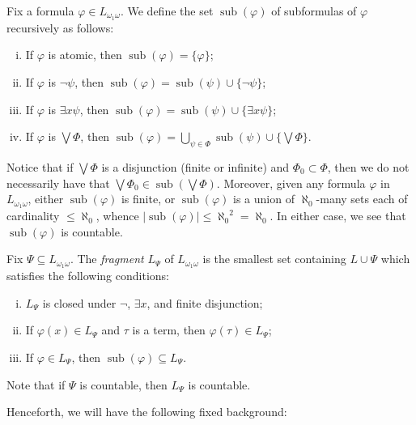 \documentclass{scrartcl}
\DeclareMathOperator{\sub}{sub}
\renewcommand{\phi}{\varphi}
\begin{document}
\begin{definition}
Fix a formula $\phi\in L_{\omega_1\omega}$. We define the set $\sub(\phi)$ of subformulas of $\phi$ recursively as follows:
\begin{enumerate}[i)]

\item If $\phi$ is atomic, then $\sub(\phi) = \{\phi\}$;

\item If $\phi$ is $\neg\psi$, then $\sub(\phi) = \sub(\psi)\cup \{\neg\psi\}$;

\item If $\phi$ is $\exists x\psi$, then $\sub(\phi) = \sub(\psi)\cup \{\exists x\psi\}$;

\item If $\phi$ is $\bigvee \Phi$, then $\sub(\phi) = \bigcup_{\psi\in\Phi} \sub(\psi)\cup \{\bigvee\Phi\}$.
\end{enumerate}
\end{definition}


Notice that if $\bigvee \Phi$ is a disjunction (finite or infinite) and $\Phi_0\subset \Phi$, then we do not necessarily have that $\bigvee \Phi_0 \in \sub (\bigvee \Phi)$. Moreover, given any formula $\phi$ in $L_{\omega_1\omega}$, either $\sub(\phi)$ is finite, or $\sub(\phi)$ is a union of $\aleph_{0}$-many sets each of cardinality $\le \aleph_{0}$, whence $|\sub(\phi)|\le {\aleph_{0}}^2 = \aleph_{0}$. In either case, we see that $\sub(\phi)$ is countable.


\begin{definition}
Fix $\Psi \subseteq L_{\omega_1\omega}$. The \emph{fragment} $L_\Psi$ of $L_{\omega_1\omega}$ is the smallest set containing $L\cup \Psi$ which satisfies the following conditions:
\begin{enumerate}[i)]
\item $L_\Psi$ is closed under $\neg$, $\exists x$, and finite disjunction;
\item If $\phi(x)\in L_\Psi$ and $\tau$ is a term, then $\phi(\tau)\in L_\Psi$;
\item If $\phi\in L_\Psi$, then $\sub(\phi)\subseteq L_\Psi$.
\end{enumerate}

\end{definition}

Note that if $\Psi$ is countable, then $L_\Psi$ is countable.

Henceforth, we will have the following fixed background:
\end{document}
